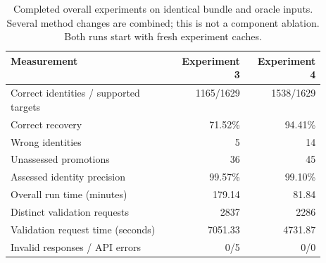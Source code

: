 \begin{table}[htbp]
\caption{Completed overall experiments on identical bundle and oracle inputs. Several method changes are combined; this is not a component ablation. Both runs start with fresh experiment caches.}
\label{tab:exp4-comparison}
\centering\small
\begin{tabular}{p{0.52\linewidth}rr}
\toprule
Measurement & Experiment 3 & Experiment 4\\
\midrule
Correct identities / supported targets & 1165/1629 & 1538/1629\\
Correct recovery & 71.52\% & 94.41\%\\
Wrong identities & 5 & 14\\
Unassessed promotions & 36 & 45\\
Assessed identity precision & 99.57\% & 99.10\%\\
Overall run time (minutes) & 179.14 & 81.84\\
Distinct validation requests & 2837 & 2286\\
Validation request time (seconds) & 7051.33 & 4731.87\\
Invalid responses / API errors & 0/5 & 0/0\\
\bottomrule
\end{tabular}
\end{table}
